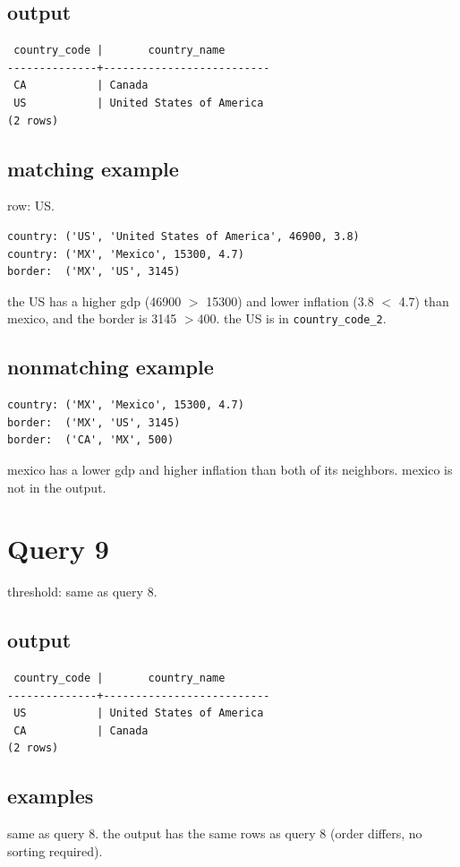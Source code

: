 \documentclass[11pt]{article}
\begin{document}
\subsection*{output}
{\small
\begin{verbatim}
 country_code |       country_name
--------------+--------------------------
 CA           | Canada
 US           | United States of America
(2 rows)
\end{verbatim}
}

\subsection*{matching example}
row: US.
\begin{verbatim}
country: ('US', 'United States of America', 46900, 3.8)
country: ('MX', 'Mexico', 15300, 4.7)
border:  ('MX', 'US', 3145)
\end{verbatim}
the US has a higher gdp (46900 $>$ 15300) and lower inflation (3.8 $<$ 4.7) than mexico, and the border is 3145 $> 400$. the US is in \texttt{country\_code\_2}.

\subsection*{nonmatching example}
\begin{verbatim}
country: ('MX', 'Mexico', 15300, 4.7)
border:  ('MX', 'US', 3145)
border:  ('CA', 'MX', 500)
\end{verbatim}
mexico has a lower gdp and higher inflation than both of its neighbors. mexico is not in the output.

\section*{Query 9}

threshold: same as query 8.

\subsection*{output}
{\small
\begin{verbatim}
 country_code |       country_name
--------------+--------------------------
 US           | United States of America
 CA           | Canada
(2 rows)
\end{verbatim}
}

\subsection*{examples}
same as query 8. the output has the same rows as query 8 (order differs, no sorting required).
\end{document}
